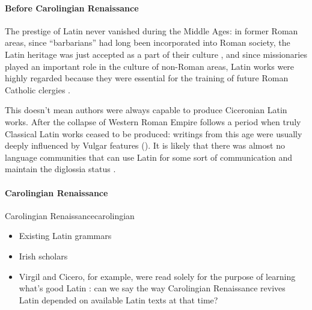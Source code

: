 \documentclass[a4paper, oneside, 12pt]{report}
\newcommand*{\citepage}[1]{p.~{#1}}
\begin{document}
\paragraph*{Before Carolingian Renaissance}
The prestige of Latin never vanished during the Middle Ages:
in former Roman areas, since ``barbarians'' had long been incorporated into Roman society, 
the Latin heritage was just accepted as a part of their culture 
\citep[\citepage{137}]{leonhardt2013latin},
and since missionaries played an important role in the culture of non-Roman areas, 
Latin works were highly regarded because they were essential 
for the training of future Roman Catholic clergies
\citep[\citepage{138}]{leonhardt2013latin}.

This doesn't mean authors were always capable to produce Ciceronian Latin works.
After the collapse of Western Roman Empire follows
a period when truly Classical Latin works ceased to be produced:
writings from this age were usually deeply influenced by Vulgar features 
().
It is likely that there was almost no language communities
that can use Latin for some sort of communication and maintain the diglossia status
\citep[\citepage{160}]{leonhardt2013latin}.

\paragraph*{Carolingian Renaissance}

\begin{todobox}{Carolingian Renaissance}{carolingian}
    \begin{itemize}
        \item Existing Latin grammars 
        \item Irish scholars
        \item Virgil and Cicero, for example, were read solely for the purpose of learning what's good Latin
        \citep[\citepage{170}]{leonhardt2013latin}:
        can we say the way Carolingian Renaissance revives Latin
        depended on available Latin texts at that time?
    \end{itemize}
\end{todobox}
\end{document}
